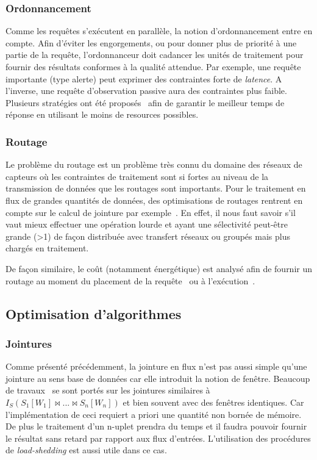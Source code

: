 \subsubsection{Ordonnancement}
Comme les requêtes s'exécutent en parallèle, la notion d'ordonnancement entre en compte. Afin d'éviter les engorgements, ou pour donner plus de priorité à une partie de la requête, l'ordonnanceur doit cadancer les unités de traitement pour fournir des résultats conformes à la qualité attendue. Par exemple, une requête importante (type alerte) peut exprimer des contraintes forte de \textit{latence}. A l'inverse, une requête d'observation passive aura des contraintes plus faible. Plusieurs stratégies ont été proposés~\cite{Babcock:chain, Jiang:scheduling} afin de garantir le meilleur temps de réponse en utilisant le moins de resources possibles.

\subsubsection{Routage}
Le problème du routage est un problème très connu du domaine des réseaux de capteurs où les contraintes de traitement sont si fortes au niveau de la transmission de données que les routages sont importants. Pour le traitement en flux de grandes quantités de données, des optimisations de routages rentrent en compte sur le calcul de jointure par exemple~\cite{Zhou:pmjoin}. En effet, il nous faut savoir s'il vaut mieux effectuer une opération lourde et ayant une sélectivité peut-être grande (>1) de façon distribuée avec transfert réseaux ou groupés mais plus chargés en traitement. 

De façon similaire, le coût (notamment énergétique) est analysé afin de fournir un routage au moment du placement de la requête~\cite{Galpin:snee} ou à l'exécution~\cite{Madden:tinydb}.

\subsection{Optimisation d'algorithmes}

\subsubsection{Jointures}
Comme présenté précédemment, la jointure en flux n'est pas aussi simple qu'une jointure au sens base de données car elle introduit la notion de fenêtre. Beaucoup de travaux~\cite{Han:join, Srivastava:join, Law:join} se sont portés sur les jointures similaires à $I_S (S_1[W_1] \Join ... \Join S_n[W_n])$ et bien souvent avec des fenêtres identiques. Car l'implémentation de ceci requiert a priori une quantité non bornée de mémoire. De plus le traitement d'un n-uplet prendra du temps et il faudra pouvoir fournir le résultat sans retard par rapport aux flux d'entrées. L'utilisation des procédures de \textit{load-shedding} est aussi utile dans ce cas.

